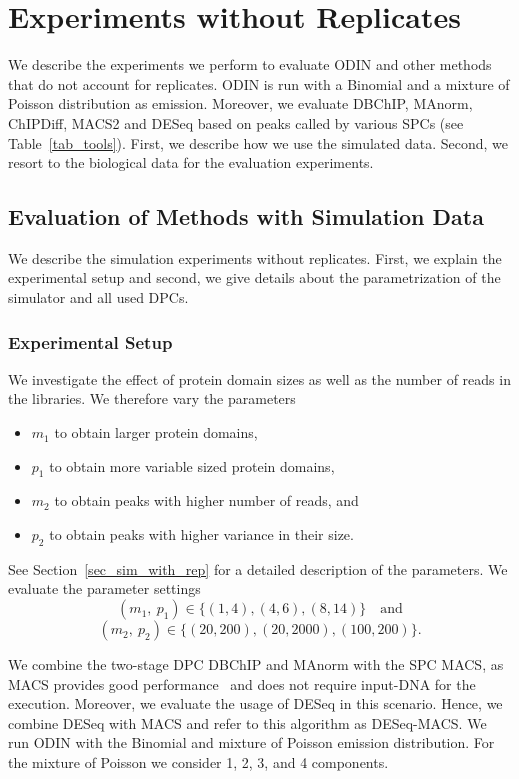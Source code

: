 \section{Experiments without Replicates}
We describe the experiments we perform to evaluate ODIN and other methods that do not account for replicates. 
ODIN is run with a Binomial and a mixture of Poisson distribution as emission.
Moreover, we evaluate DBChIP, MAnorm, ChIPDiff, MACS2 and DESeq based on peaks called by various SPCs (see Table~\ref{tab_tools}).
First, we describe how we use the simulated data.
Second, we resort to the biological data for the evaluation experiments.

\subsection{Evaluation of Methods with Simulation Data}
\label{sec_expmethods_sim_without}
We describe the simulation experiments without replicates.
First, we explain the experimental setup and second, we give details about the parametrization of the simulator and all used DPCs.

\subsubsection{Experimental Setup}
We investigate the effect of protein domain sizes as well as the number of reads in the libraries.
We therefore vary the parameters
\begin{itemize}
 \item $m_1$ to obtain larger protein domains,
 \item $p_1$ to obtain more variable sized protein domains,
 \item $m_2$ to obtain peaks with higher number of reads, and
 \item $p_2$ to obtain peaks with higher variance in their size.
\end{itemize}
See Section~\ref{sec_sim_with_rep} for a detailed description of the parameters.
We evaluate the parameter settings
$$(m_1,\ p_1) \in  \{(1,4),(4,6),(8,14)\} \quad \text{and}$$ 
$$(m_2,\ p_2) \in \{(20,200),(20,2000),(100,200)\}.$$

We combine the two-stage DPC DBChIP and MAnorm with the SPC MACS, as MACS provides good performance~\citep{Chen2012, wilbanks2010} and does not require input-DNA for the execution.
Moreover, we evaluate the usage of DESeq in this scenario.
Hence, we combine DESeq with MACS and refer to this algorithm as DESeq-MACS.
We run ODIN with the Binomial and mixture of Poisson emission distribution.
For the mixture of Poisson we consider 1, 2, 3, and 4 components.


